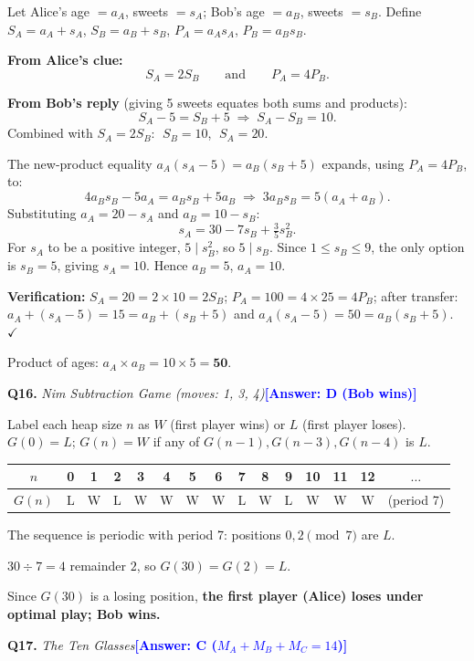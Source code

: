 \documentclass[a4paper,12pt]{article}
\newcommand{\ans}[1]{\textcolor{blue}{\textbf{[Answer: #1]}}}
\newcommand{\qsol}[3]{%
  \vspace{1.5ex}%
  \noindent\textbf{Q#1.} \textit{#2}\quad\ans{#3}%
  \par\vspace{0.4ex}%
}
\begin{document}
Let Alice's age $= a_A$, sweets $= s_A$; Bob's age $= a_B$, sweets $= s_B$.
Define $S_A = a_A+s_A$, $S_B = a_B+s_B$, $P_A = a_A s_A$, $P_B = a_B s_B$.

\textbf{From Alice's clue:}
\[
  S_A = 2S_B \qquad \text{and} \qquad P_A = 4P_B.
\]

\textbf{From Bob's reply} (giving 5 sweets equates both sums and products):
\[
  S_A - 5 = S_B + 5 \;\Rightarrow\; S_A - S_B = 10.
\]
Combined with $S_A = 2S_B$: $\;S_B = 10$, $\;S_A = 20$.

The new-product equality $a_A(s_A-5) = a_B(s_B+5)$ expands, using
$P_A = 4P_B$, to:
\[
  4a_B s_B - 5a_A = a_B s_B + 5a_B
  \;\Rightarrow\;
  3a_B s_B = 5(a_A + a_B).
\]
Substituting $a_A = 20 - s_A$ and $a_B = 10 - s_B$:
\[
  s_A = 30 - 7s_B + \tfrac{3}{5}s_B^2.
\]
For $s_A$ to be a positive integer, $5\mid s_B^2$, so $5\mid s_B$.
Since $1 \le s_B \le 9$, the only option is $s_B = 5$, giving $s_A = 10$.
Hence $a_B = 5$, $a_A = 10$.

\textbf{Verification:} $S_A = 20 = 2\times10 = 2S_B$;\;
$P_A = 100 = 4\times25 = 4P_B$;\;
after transfer: $a_A+(s_A-5)=15=a_B+(s_B+5)$ and
$a_A(s_A-5)=50=a_B(s_B+5)$. $\checkmark$

Product of ages: $a_A \times a_B = 10\times5 = \mathbf{50}$.

\qsol{16}{Nim Subtraction Game (moves: 1, 3, 4)}{D (Bob wins)}

Label each heap size $n$ as $W$ (first player wins) or $L$ (first player
loses). $G(0)=L$; $G(n)=W$ if any of $G(n-1), G(n-3), G(n-4)$ is $L$.

\begin{center}
\begin{tabular}{ccccccccccccccc}
\toprule
$n$ & 0 & 1 & 2 & 3 & 4 & 5 & 6 & 7 & 8 & 9 & 10 & 11 & 12 & $\ldots$ \\
\midrule
$G(n)$ & L & W & L & W & W & W & W & L & W & L & W & W & W & (period 7) \\
\bottomrule
\end{tabular}
\end{center}

The sequence is periodic with period 7: positions $0, 2 \pmod{7}$ are $L$.

$30 \div 7 = 4$ remainder $2$, so $G(30) = G(2) = L$.

Since $G(30)$ is a losing position, \textbf{the first player (Alice) loses
under optimal play; Bob wins.}

\qsol{17}{The Ten Glasses}{C ($M_A+M_B+M_C = 14$)}
\end{document}
